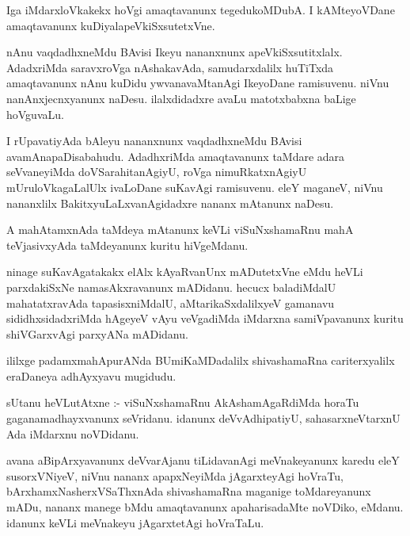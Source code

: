 \documentclass{article}
\begin{document}
\begin{mn}
Iga iMdarxloVkakekx hoVgi amaqtavanunx tegedukoMDubA. I kAMteyoVDane
 amaqtavanunx kuDiyalapeVkiSxsutetxVne.
\end{mn}

\begin{mn}
nAnu vaqdadhxneMdu BAvisi Ikeyu nananxnunx apeVkiSxsutitxlalx. AdadxriMda
saravxroVga nAshakavAda, samudarxdalilx huTiTxda amaqtavanunx nAnu kuDidu 
ywvanavaMtanAgi IkeyoDane ramisuvenu. niVnu nanAnxjecnxyanunx naDesu.
 ilalxdidadxre avaLu matotxbabxna baLige hoVguvaLu.
\end{mn}

\begin{mn}
I rUpavatiyAda bAleyu nananxnunx vaqdadhxneMdu BAvisi 
avamAnapaDisabahudu. AdadhxriMda amaqtavanunx taMdare adara seVvaneyiMda
 doVSarahitanAgiyU, roVga nimuRkatxnAgiyU mUruloVkagaLalUlx ivaLoDane
 suKavAgi ramisuvenu. eleY maganeV, niVnu  nananxlilx 
 BakitxyuLaLxvanAgidadxre nananx mAtanunx naDesu.
\end{mn}

\begin{mn}
A mahAtamxnAda  taMdeya mAtanunx keVLi viSuNxshamaRnu mahA teVjasivxyAda 
taMdeyanunx kuritu hiVgeMdanu.
\end{mn}

\begin{mn}
ninage suKavAgatakakx elAlx kAyaRvanUnx mADutetxVne eMdu heVLi
 parxdakiSxNe namasAkxravanunx mADidanu. hecucx baladiMdalU mahatatxravAda
 tapasisxniMdalU, aMtarikaSxdalilxyeV gamanavu sididhxsidadxriMda hAgeyeV 
 vAyu veVgadiMda iMdarxna samiVpavanunx kuritu shiVGarxvAgi parxyANa mADidanu.
 \end{mn}
 
 \begin{mn}
 ililxge padamxmahApurANda BUmiKaMDadalilx shivashamaRna cariterxyalilx 
 eraDaneya adhAyxyavu mugidudu.
\end{mn}








\begin{mn}
sUtanu heVLutAtxne :- viSuNxshamaRnu AkAshamAgaRdiMda horaTu 
gaganamadhayxvanunx seVridanu. idanunx deVvAdhipatiyU,
 sahasarxneVtarxnU Ada iMdarxnu noVDidanu.
\end{mn}

\begin{mn}
avana aBipArxyavanunx deVvarAjanu tiLidavanAgi meVnakeyanunx karedu  eleY
susorxVNiyeV, niVnu nananx apapxNeyiMda jAgarxteyAgi hoVraTu, 
bArxhamxNasherxVSaThxnAda shivashamaRna maganige toMdareyanunx mADu,
 nananx manege bMdu amaqtavanunx apaharisadaMte noVDiko, eMdanu.
  idanunx keVLi meVnakeyu jAgarxtetAgi hoVraTaLu.
\end{mn}
\end{document}
